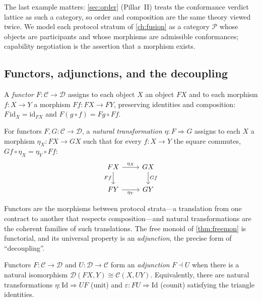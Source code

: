 The last example matters: \cref{sec:order} (Pillar~II) treats the conformance
verdict lattice as such a category, so order and composition are the same theory
viewed twice. We model each protocol stratum of \cref{ch:fusion} as a category
$\mathcal P$ whose objects are participants and whose morphisms are admissible
conformances; capability negotiation is the assertion that a morphism exists.

\subsection{Functors, adjunctions, and the decoupling}
\label{sec:alg-functor}

\begin{definition}[Functor]
A \emph{functor} $F\colon\mathcal C\to\mathcal D$ assigns to each object $X$ an
object $FX$ and to each morphism $f\colon X\to Y$ a morphism $Ff\colon FX\to FY$,
preserving identities and composition: $F\,\mathrm{id}_X=\mathrm{id}_{FX}$ and
$F(g\circ f)=Fg\circ Ff$.
\end{definition}

\begin{definition}
For functors $F,G\colon\mathcal C\to\mathcal D$, a \emph{natural transformation}
$\eta\colon F\Rightarrow G$ assigns to each $X$ a morphism $\eta_X\colon FX\to GX$
such that for every $f\colon X\to Y$ the square commutes,
$G f\circ\eta_X=\eta_Y\circ F f$:
\[
\begin{tikzcd}[ampersand replacement=\&]
FX \arrow[r,"\eta_X"] \arrow[d,"Ff"'] \& GX \arrow[d,"Gf"]\\
FY \arrow[r,"\eta_Y"'] \& GY
\end{tikzcd}
\]
\end{definition}

Functors are the morphisms between protocol strata---a translation from one
contract to another that respects composition---and natural transformations are
the coherent families of such translations. The free monoid of
\cref{thm:freemon} is functorial, and its universal property is an
\emph{adjunction}, the precise form of ``decoupling''.

\begin{definition}[Adjunction]
\label{def:adjunction}
Functors $F\colon\mathcal C\to\mathcal D$ and $U\colon\mathcal D\to\mathcal C$
form an \emph{adjunction} $F\dashv U$ when there is a natural isomorphism
$\mathcal D(FX,Y)\cong\mathcal C(X,UY)$. Equivalently, there are natural
transformations $\eta\colon\mathrm{Id}\Rightarrow UF$ (unit) and
$\varepsilon\colon FU\Rightarrow\mathrm{Id}$ (counit) satisfying the triangle
identities.
\end{definition}

